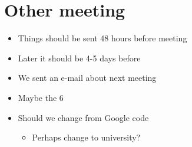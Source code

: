 \documentclass{article}
\begin{document}
\section{Other meeting}

\begin{itemize}
	\item Things should be sent 48 hours before meeting
	\item Later it should be 4-5 days before
	\item We sent an e-mail about next meeting
	\item Maybe the 6
	\item Should we change from Google code
	
	\begin{itemize}
		\item Perhaps change to university?
	\end{itemize}
	
\end{itemize}
\end{document}
